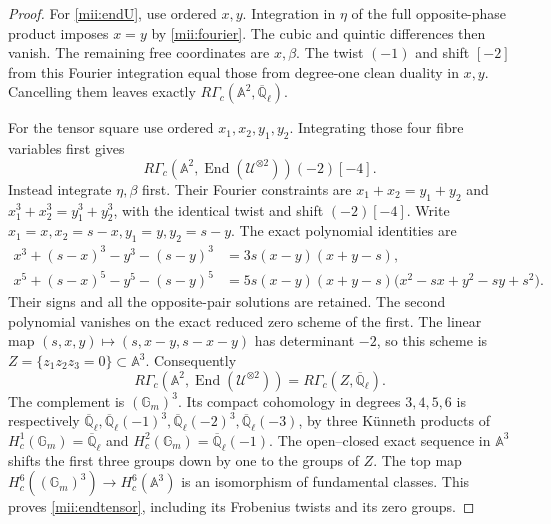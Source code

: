 \documentclass[11pt]{article}
\renewcommand{\AA}{\mathbb A}
\newcommand{\QQl}{\overline{\mathbb Q}_\ell}
\newcommand{\End}{\operatorname{End}}
\begin{document}
\begin{proof}
For \eqref{mii:endU}, use ordered $x,y$. Integration in $\eta$ of the
full opposite-phase product imposes $x=y$ by \eqref{mii:fourier}.
The cubic and quintic differences then vanish. The remaining free
coordinates are $x,\beta$. The twist $(-1)$ and shift $[-2]$ from this
Fourier integration equal those from degree-one clean duality in $x,y$.
Cancelling them leaves exactly $R\Gamma_c(\AA^2,\QQl)$.

For the tensor square use ordered $x_1,x_2,y_1,y_2$. Integrating those
four fibre variables first gives
\[
 R\Gamma_c(\AA^2,\End(\mathcal U^{\otimes2}))(-2)[-4].
\]
Instead integrate $\eta,\beta$ first. Their Fourier constraints are
$x_1+x_2=y_1+y_2$ and $x_1^3+x_2^3=y_1^3+y_2^3$, with the identical
twist and shift $(-2)[-4]$. Write $x_1=x,x_2=s-x,y_1=y,y_2=s-y$.
The exact polynomial identities are
\begin{equation}\tag{MII12}\label{mii:phasefactor}
 \begin{aligned}
 x^3+(s-x)^3-y^3-(s-y)^3
     &=3s(x-y)(x+y-s),\\
 x^5+(s-x)^5-y^5-(s-y)^5
     &=5s(x-y)(x+y-s)\bigl(x^2-sx+y^2-sy+s^2\bigr).
 \end{aligned}
\end{equation}
Their signs and all the opposite-pair solutions are retained. The
second polynomial vanishes on the exact reduced zero scheme of the
first. The linear map
$(s,x,y)\mapsto(s,x-y,s-x-y)$ has determinant $-2$, so this scheme
is $Z=\{z_1z_2z_3=0\}\subset\AA^3$. Consequently
\[
 R\Gamma_c(\AA^2,\End(\mathcal U^{\otimes2}))
       =R\Gamma_c(Z,\QQl).
\]
The complement is $(\mathbb G_m)^3$. Its compact cohomology in degrees
$3,4,5,6$ is respectively
$\QQl,\QQl(-1)^3,\QQl(-2)^3,\QQl(-3)$, by three K\"unneth products
of $H_c^1(\mathbb G_m)=\QQl$ and $H_c^2(\mathbb G_m)=\QQl(-1)$.
The open--closed exact sequence in $\AA^3$ shifts the first three
groups down by one to the groups of $Z$. The top map
$H_c^6((\mathbb G_m)^3)\to H_c^6(\AA^3)$ is an isomorphism of
fundamental classes. This proves \eqref{mii:endtensor}, including its
Frobenius twists and its zero groups.


\end{proof}
\end{document}
